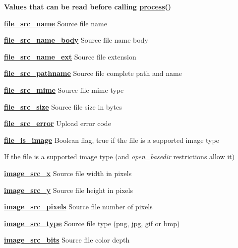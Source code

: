 {\bfseries Values that can be read before calling \hyperlink{}{process}()} 
\begin{DoxyItemize}
\item {\bfseries \hyperlink{}{file\+\_\+src\+\_\+name}} Source file name 
\item {\bfseries \hyperlink{}{file\+\_\+src\+\_\+name\+\_\+body}} Source file name body 
\item {\bfseries \hyperlink{}{file\+\_\+src\+\_\+name\+\_\+ext}} Source file extension 
\item {\bfseries \hyperlink{}{file\+\_\+src\+\_\+pathname}} Source file complete path and name 
\item {\bfseries \hyperlink{}{file\+\_\+src\+\_\+mime}} Source file mime type 
\item {\bfseries \hyperlink{}{file\+\_\+src\+\_\+size}} Source file size in bytes 
\item {\bfseries \hyperlink{}{file\+\_\+src\+\_\+error}} Upload error code 
\item {\bfseries \hyperlink{}{file\+\_\+is\+\_\+image}} Boolean flag, true if the file is a supported image type 
\end{DoxyItemize}If the file is a supported image type (and {\itshape open\+\_\+basedir} restrictions allow it) 
\begin{DoxyItemize}
\item {\bfseries \hyperlink{}{image\+\_\+src\+\_\+x}} Source file width in pixels 
\item {\bfseries \hyperlink{}{image\+\_\+src\+\_\+y}} Source file height in pixels 
\item {\bfseries \hyperlink{}{image\+\_\+src\+\_\+pixels}} Source file number of pixels 
\item {\bfseries \hyperlink{}{image\+\_\+src\+\_\+type}} Source file type (png, jpg, gif or bmp) 
\item {\bfseries \hyperlink{}{image\+\_\+src\+\_\+bits}} Source file color depth 
\end{DoxyItemize}

